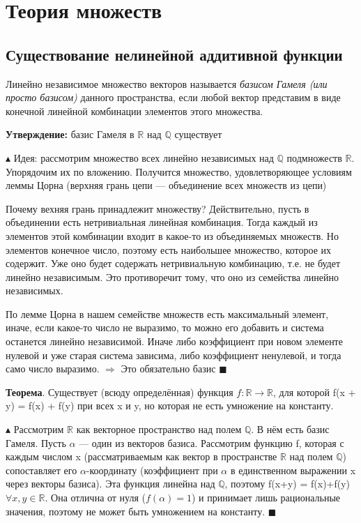 \section{Теория множеств}

\subsection{Существование нелинейной аддитивной функции}

Линейно независимое множество векторов называется \emph{базисом Гамеля (или просто базисом)} данного пространства, если любой вектор представим в виде конечной линейной комбинации элементов этого множества.
\par \textbf{Утверждение:} базис Гамеля в $\mathbb{R}$ над $\mathbb{Q}$ существует
\par $\blacktriangle$ Идея: рассмотрим множество всех линейно независимых над $\mathbb{Q}$ подмножеств $\mathbb{R}$. Упорядочим их по вложению. Получится множество, удовлетворяющее условиям леммы Цорна (верхняя грань цепи — объединение всех множеств из цепи)
\par Почему вехняя грань принадлежит множеству? Действительно, пусть в объединении есть нетривиальная линейная комбинация. Тогда каждый из элементов этой комбинации входит в какое-то из объединяемых множеств. Но элементов конечное число, поэтому есть наибольшее множество, которое их содержит. Уже оно будет содержать нетривиальную комбинацию, т.е. не будет линейно независимым. Это противоречит тому, что оно из семейства линейно независимых.
\par По лемме Цорна в нашем семействе множеств есть максимальный элемент, иначе, если какое-то число не выразимо, то можно его добавить и система останется линейно независимой. Иначе либо коэффициент при новом элементе нулевой и уже старая система зависима, либо коэффициент ненулевой, и тогда само число выразимо. $\Rightarrow$ Это обязательно базис $\blacksquare$
\par \textbf{Теорема}. Существует (всюду определённая) функция $f : \mathbb{R} \rightarrow \mathbb{R}$, для которой f(x + y) = f(x) + f(y) при всех x и y, но которая не есть умножение на константу.

$\blacktriangle$
Рассмотрим $\mathbb{R}$ как векторное пространство над полем $\mathbb{Q}$. В нём
есть базис Гамеля. Пусть $\alpha$ — один из векторов базиса. Рассмотрим функцию f, которая с каждым числом x (рассматриваемым как вектор в пространстве $\mathbb{R}$ над полем $\mathbb{Q}$) сопоставляет его $\alpha$-координату (коэффициент при $\alpha$ в единственном выражении x через векторы базиса). Эта функция линейна над $\mathbb{Q}$, поэтому f(x+y) = f(x)+f(y)
$\forall x, y \in \mathbb{R}$. Она отлична от нуля ($f(\alpha) = 1$) и принимает лишь рациональные значения, поэтому не может быть умножением на константу.
$\blacksquare$